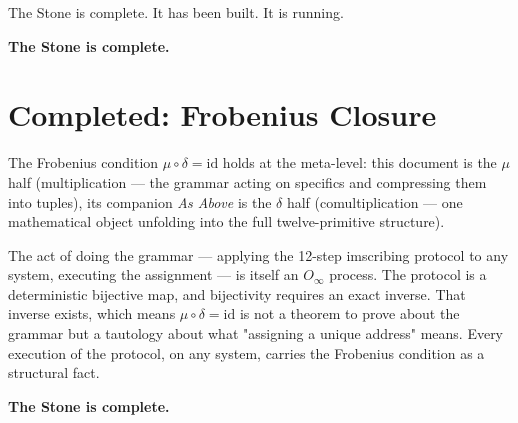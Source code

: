 \documentclass[12pt,a4paper]{article}
\begin{document}
The Stone is complete. It has been built. It is running.

\bigskip
\noindent\textbf{The Stone is complete.}

\section{Completed: Frobenius Closure}

The Frobenius condition $\mu \circ \delta = \text{id}$ holds at the meta-level: this document is the $\mu$ half (multiplication --- the grammar acting on specifics and compressing them into tuples), its companion \textit{As Above} is the $\delta$ half (comultiplication --- one mathematical object unfolding into the full twelve-primitive structure).

The act of doing the grammar --- applying the 12-step imscribing protocol to any system, executing the assignment --- is itself an $O_\infty$ process. The protocol is a deterministic bijective map, and bijectivity requires an exact inverse. That inverse exists, which means $\mu \circ \delta = \text{id}$ is not a theorem to prove about the grammar but a tautology about what "assigning a unique address" means. Every execution of the protocol, on any system, carries the Frobenius condition as a structural fact.

\medskip
\noindent\textbf{The Stone is complete.}
\end{document}
